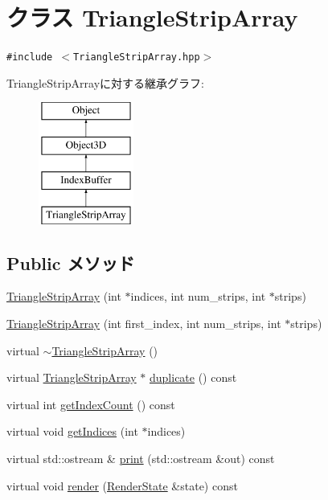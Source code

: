 \hypertarget{classm3g_1_1TriangleStripArray}{
\section{クラス TriangleStripArray}
\label{classm3g_1_1TriangleStripArray}
}
{\tt \#include $<$TriangleStripArray.hpp$>$}

TriangleStripArrayに対する継承グラフ:\begin{figure}[H]
\begin{center}
\leavevmode
\includegraphics[height=4cm]{classm3g_1_1TriangleStripArray}
\end{center}
\end{figure}
\subsection*{Public メソッド}
\begin{CompactItemize}
\item 
\hyperlink{classm3g_1_1TriangleStripArray_57d4e874819367084aeadb11593c4436}{TriangleStripArray} (int $\ast$indices, int num\_\-strips, int $\ast$strips)
\item 
\hyperlink{classm3g_1_1TriangleStripArray_d2ca9884a6ccf32da3cee977549b5ee0}{TriangleStripArray} (int first\_\-index, int num\_\-strips, int $\ast$strips)
\item 
virtual \hyperlink{classm3g_1_1TriangleStripArray_1cb3853bf79b7710d57044da818d2cde}{$\sim$TriangleStripArray} ()
\item 
virtual \hyperlink{classm3g_1_1TriangleStripArray}{TriangleStripArray} $\ast$ \hyperlink{classm3g_1_1TriangleStripArray_1623fbdfe91eb2e9d4a67bece6a46904}{duplicate} () const 
\item 
virtual int \hyperlink{classm3g_1_1TriangleStripArray_fe9ae2993ebcdb93d5ff26d57c81b73e}{getIndexCount} () const 
\item 
virtual void \hyperlink{classm3g_1_1TriangleStripArray_650953afac45099025a524ab160b911f}{getIndices} (int $\ast$indices)
\item 
virtual std::ostream \& \hyperlink{classm3g_1_1TriangleStripArray_6fea17fa1532df3794f8cb39cb4f911f}{print} (std::ostream \&out) const 
\item 
virtual void \hyperlink{classm3g_1_1TriangleStripArray_8babc8a79b78615da51161e94029eea9}{render} (\hyperlink{structm3g_1_1RenderState}{RenderState} \&state) const 
\end{CompactItemize}


